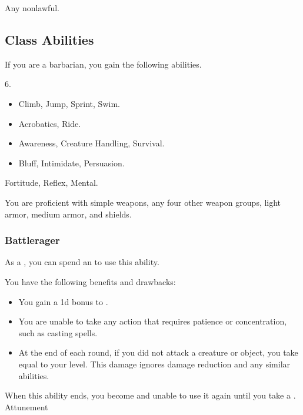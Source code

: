      Any nonlawful.

    \subsection{Class Abilities}
        If you are a barbarian, you gain the following abilities.

         6.

        \begin{itemize}
            \item {} Climb, Jump, Sprint, Swim.
            \item {} Acrobatics, Ride.
            \item {} Awareness, Creature Handling, Survival.
            \item {} Bluff, Intimidate, Persuasion.
        \end{itemize}

          Fortitude,  Reflex,  Mental.

        You are proficient with simple weapons, any four other weapon groups, light armor, medium armor, and shields.

        \subsubsection{Battlerager}\label{Rage}

            As a , you can spend an  to use this ability.
            \begin{ability}
                \begin{spelleffects}
                    \spelleffect You have the following benefits and drawbacks:
                    \begin{itemize}
                        \item You gain a \plus1d bonus to .
                        \item You are unable to take any action that requires patience or concentration, such as casting spells.
                        \item At the end of each round, if you did not attack a creature or object, you take  equal to your level.
                            This damage ignores damage reduction and any similar abilities.
                    \end{itemize}
                    \spellspecial When this ability ends, you become \fatigued and unable to use it again until you take a .
                    \spelldur Attunement
                \end{spelleffects}
            \end{ability}


